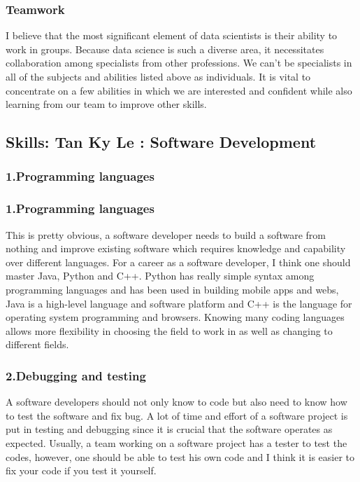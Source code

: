 \documentclass[a4paper, 11pt]{report}
\begin{document}
    \subsubsection{Teamwork}
    I believe that the most significant element of data scientists is their ability to work in groups. Because data science is such a diverse area, it necessitates collaboration among specialists from other professions. We can't be specialists in all of the subjects and abilities listed above as individuals. It is vital to concentrate on a few abilities in which we are interested and confident while also learning from our team to improve other skills.

\subsection{Skills: Tan Ky Le : Software Development}

\subsubsection{1.Programming languages}
	\subsubsection{1.Programming languages}
	This is pretty obvious, a software developer needs to build a software from nothing and improve existing software which requires knowledge and capability over different languages. For a career as a software developer, I think one should master Java, Python and C++. Python has really simple syntax among programming languages and has been used in building mobile apps and webs, Java is a high-level language and software platform and C++ is the language for operating system programming and browsers\cite{ky1}. Knowing many coding languages allows more flexibility in choosing the field to work in as well as changing to different fields.
	\subsubsection{2.Debugging and testing}
	A software developers should not only know to code but also need to know how to test the software and fix bug. A lot of time and effort of a software project is put in testing and debugging since it is crucial that the software operates as expected. Usually, a team working on a software project has a tester to test the codes, however, one should be able to test his own code and I think it is easier to fix your code if you test it yourself. 
\end{document}
